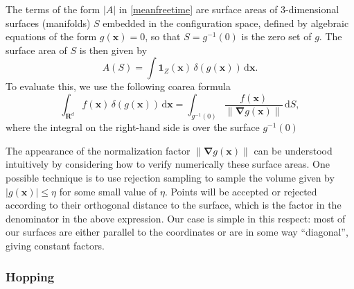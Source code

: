\documentclass[superscriptaddress,pre,reprint,showpacs,twocolumn]{revtex4-1}
\newcommand{\indicatorsymbol}{\mathbf{1}}
\begin{document}
The terms of the form $|A|$ in \eqref{meanfreetime} are surface areas of 3-dimensional surfaces (manifolds) $S$ embedded in the configuration space,
defined by algebraic equations of the form $g(\mathbf{x}) = 0$, so that $S = g^{-1}(0)$ is the zero set of $g$.
The surface area of $S$ is then given by
\begin{equation}
A(S) = \int \indicatorsymbol_Z(\mathbf{x}) \, \delta(g(\mathbf{x})) \, \mathrm{d} \mathbf{x}.
\label{eq:surface-area}
\end{equation}
To evaluate this, we use the following coarea formula
\cite[section 6.1]{Hormander83} 
\begin{equation}
\int_{\mathbf{R}^d} f(\mathbf{x}) \, \delta(g(\mathbf{x})) \, \mathrm{d} \mathbf{x} = \int_{g^{-1}(0)}\frac{f(\mathbf{x})}{\| \mathbf{\nabla}g(\mathbf{x}) \|} \, \mathrm{d}S,
\label{eq:surface-dirac}
\end{equation}
where the integral on the right-hand side is over the surface $g^{-1}(0)$
\cite{Zappa2018}


The appearance of the normalization factor $\| \mathbf{\nabla}g(\mathbf{x}) \|$ can be understood intuitively by considering how to verify numerically these surface areas. One possible technique is to use rejection sampling to sample the volume given by $|g(\mathbf{x})| \le \eta$ for some small value of $\eta$. Points will be accepted or rejected according to their orthogonal distance to the surface, which is the factor in the denominator in the above expression. Our case is simple in this respect: most of our surfaces are either parallel to the coordinates or are in some way ``diagonal'', giving constant factors.


\subsubsection{Hopping}
\end{document}
